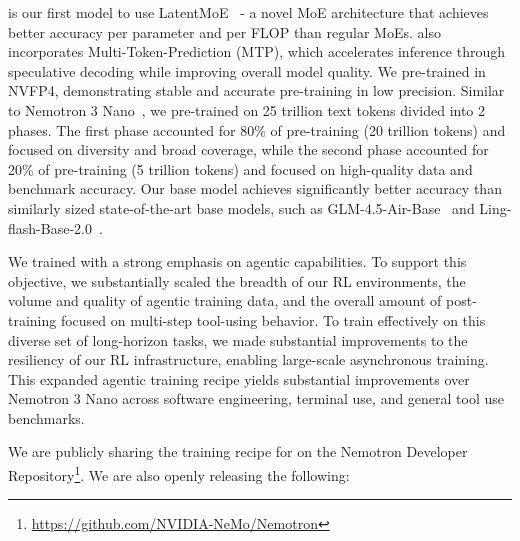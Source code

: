 \ourmodel is our first model to use LatentMoE~\citep{latentmoe_tr} - a novel MoE architecture that achieves better accuracy per parameter and per FLOP than regular MoEs. \ourmodel also incorporates Multi-Token-Prediction (MTP), which accelerates inference through speculative decoding while improving overall model quality. We pre-trained \ourmodel in NVFP4, demonstrating stable and accurate pre-training in low precision. Similar to Nemotron 3 Nano~\citep{nvidia2025nemotron3nanoopen}, we pre-trained \ourmodel on 25 trillion text tokens divided into 2 phases. The first phase accounted for 80\% of pre-training (20 trillion tokens) and focused on diversity and broad coverage, while the second phase accounted for 20\% of pre-training (5 trillion tokens) and focused on high-quality data and benchmark accuracy. Our base model achieves significantly better accuracy than similarly sized state-of-the-art base models, such as GLM-4.5-Air-Base~\citep{5team2025glm45agenticreasoningcoding} and Ling-flash-Base-2.0~\citep{lingteam2025every}. 

We trained \ourmodel with a strong emphasis on agentic capabilities. To support this objective, we substantially scaled the breadth of our RL environments, the volume and quality of agentic training data, and the overall amount of post-training focused on multi-step tool-using behavior. To train effectively on this diverse set of long-horizon tasks, we made substantial improvements to the resiliency of our RL infrastructure, enabling large-scale asynchronous training. This expanded agentic training recipe yields substantial improvements over Nemotron 3 Nano across software engineering, terminal use, and general tool use benchmarks.

We are publicly sharing the training recipe for \ourmodel on the Nemotron Developer Repository\footnote{\href{https://github.com/NVIDIA-NeMo/Nemotron}{https://github.com/NVIDIA-NeMo/Nemotron}}. We are also openly releasing the following:

